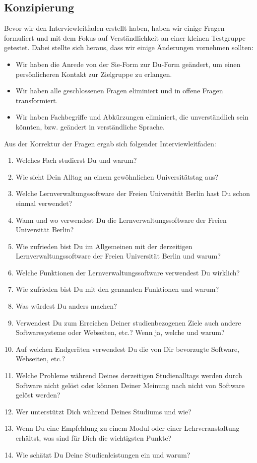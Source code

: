 \documentclass{article}
\begin{document}
\subsection{Konzipierung}

Bevor wir den Interviewleitfaden erstellt haben, haben wir einige Fragen formuliert und mit dem Fokus auf Verständlichkeit an einer kleinen Testgruppe getestet. Dabei stellte sich heraus, dass wir einige Änderungen vornehmen sollten:
\begin{itemize}
\item Wir haben die Anrede von der Sie-Form zur Du-Form geändert, um einen persönlicheren Kontakt zur Zielgruppe zu erlangen.
\item Wir haben alle geschlossenen Fragen eliminiert und in offene Fragen transformiert.
\item Wir haben Fachbegriffe und Abkürzungen eliminiert, die unverständlich sein könnten, bzw. geändert in verständliche Sprache.
\end{itemize}
Aus der Korrektur der Fragen ergab sich folgender Interviewleitfaden:
\begin{enumerate}
\item Welches Fach studierst Du und warum?
\item Wie sieht Dein Alltag an einem gewöhnlichen Universitätstag aus?
\item Welche Lernverwaltungssoftware der Freien Universität Berlin hast Du schon einmal verwendet?
\item Wann und wo verwendest Du die Lernverwaltungssoftware der Freien Universität Berlin?
\item Wie zufrieden bist Du im Allgemeinen mit der derzeitigen Lernverwaltungssoftware der Freien Universität Berlin und warum?
\item Welche Funktionen der Lernverwaltungssoftware verwendest Du wirklich?
\item Wie zufrieden bist Du mit den genannten Funktionen und warum?
\item Was würdest Du anders machen?
\item Verwendest Du zum Erreichen Deiner studienbezogenen Ziele auch andere Softwaresysteme oder Webseiten, etc.? Wenn ja, welche und warum?
\item Auf welchen Endgeräten verwendest Du die von Dir bevorzugte Software, Webseiten, etc.?
\item Welche Probleme während Deines derzeitigen Studienalltags werden durch Software nicht gelöst oder können Deiner Meinung nach nicht von Software gelöst werden?
\item Wer unterstützt Dich während Deines Studiums und wie?
\item Wenn Du eine Empfehlung zu einem Modul oder einer Lehrveranstaltung erhältst, was sind für Dich die wichtigsten Punkte?
\item Wie schätzt Du Deine Studienleistungen ein und warum?
\end{enumerate}
\end{document}
